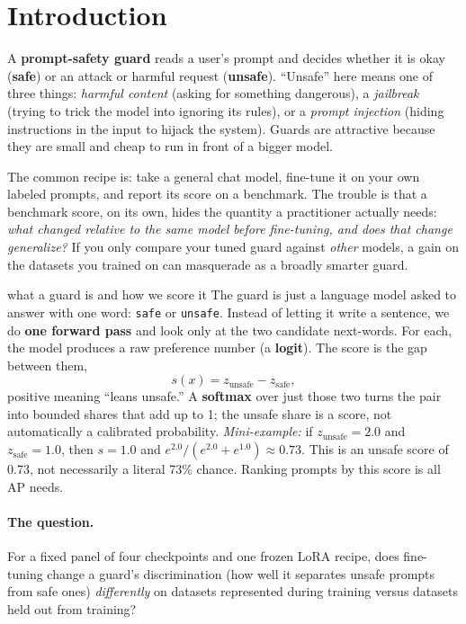 \documentclass[11pt]{article}
\newcommand{\code}[1]{\texttt{\small #1}}
\begin{document}
\setcounter{tocdepth}{1}
\begingroup
\small
\tableofcontents
\endgroup

\clearpage
\section{Introduction}

A \textbf{prompt-safety guard} reads a user's prompt and decides whether it is okay
(\textbf{safe}) or an attack or harmful request (\textbf{unsafe}). ``Unsafe'' here means one
of three things: \emph{harmful content} (asking for something dangerous), a \emph{jailbreak}
(trying to trick the model into ignoring its rules), or a \emph{prompt injection} (hiding
instructions in the input to hijack the system). Guards are attractive because they are
small and cheap to run in front of a bigger model.

The common recipe is: take a general chat model, fine-tune it on your own labeled prompts,
and report its score on a benchmark. The trouble is that a benchmark score, on its own,
hides the quantity a practitioner actually needs: \emph{what changed relative to the same
model before fine-tuning, and does that change generalize?} If you only compare your tuned
guard against \emph{other} models, a gain on the datasets you trained on can masquerade as a
broadly smarter guard.

\begin{background}{what a guard is and how we score it}
\small
The guard is just a language model asked to answer with one word: \code{safe} or
\code{unsafe}. Instead of letting it write a sentence, we do \textbf{one forward pass} and
look only at the two candidate next-words. For each, the model produces a raw preference
number (a \textbf{logit}). The score is the gap between them,
\[
s(x) = z_{\text{unsafe}} - z_{\text{safe}},
\]
positive meaning ``leans unsafe.'' A \textbf{softmax} over just those two turns the pair into
bounded shares that add up to 1; the unsafe share is a score, not automatically a calibrated
probability. \emph{Mini-example:} if $z_{\text{unsafe}}=2.0$ and
$z_{\text{safe}}=1.0$, then $s=1.0$ and
$e^{2.0}/(e^{2.0}+e^{1.0}) \approx 0.73$. This is an unsafe score of 0.73, not necessarily a
literal 73\% chance. Ranking prompts by this score is all AP needs.
\end{background}

\paragraph{The question.} For a fixed panel of four checkpoints and one frozen LoRA recipe,
does fine-tuning change a guard's discrimination (how well it separates unsafe prompts from
safe ones) \emph{differently} on datasets represented during training versus datasets held out
from training?
\end{document}
